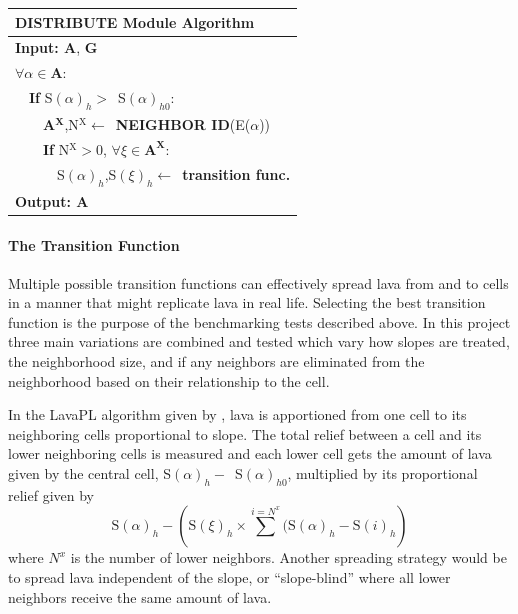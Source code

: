 \documentclass[12pt,letter]{article}
\begin{document}
			\begin{center}
				\begin{tabular}{l}
					\toprule
					\textbf{DISTRIBUTE Module Algorithm}\\
					\midrule
					\textbf{Input: A}, \textbf{G}\\
					$\forall \alpha \in \mathbf{A}$:\\
					~~\textbf{If} S$(\alpha)_h>$~S$(\alpha)_{h0}$:\\
					~~~~\textbf{A}$^{\mathbf{X}}$,N$^\mathrm{X}\leftarrow$~\textbf{NEIGHBOR ID}(E($\alpha$))\\
					~~~~\textbf{If} N$^\mathrm{X}>0$, $\forall \xi \in \mathbf{A^X}$:\\
					~~~~~~S$(\alpha)_h$,S$(\xi)_h\leftarrow$~\textbf{transition func.}\\
					\textbf{Output: A}\\
					\bottomrule
				\end{tabular}
			\end{center}
			
			\paragraph{The Transition Function}
			Multiple possible transition functions can effectively spread lava from and to cells in a manner that might replicate lava in real life. Selecting the best transition function is the purpose of the benchmarking tests described above. In this project three main variations are combined and tested which vary how slopes are treated, the neighborhood size, and if any neighbors are eliminated from the neighborhood based on their relationship to the cell.
			
			In the LavaPL algorithm given by \citet{connor2012}, lava is apportioned from one cell to its neighboring cells proportional to slope. The total relief between a cell and its lower neighboring cells is measured and each lower cell gets the amount of lava given by the central cell, S$(\alpha)_h-$~S$(\alpha)_{h0}$, multiplied by its proportional relief given by 
			\begin{equation}
				\mathrm{S}(\alpha)_h-\left(\mathrm{S}(\xi)_h\times\sum^{i=N^x}(\mathrm{S}(\alpha)_h-\mathrm{S}(i)_h\right)
			\end{equation}
			where $N^x$ is the number of lower neighbors. Another spreading strategy would be to spread lava independent of the slope, or ``slope-blind'' where all lower neighbors receive the same amount of lava.
			
\end{document}
